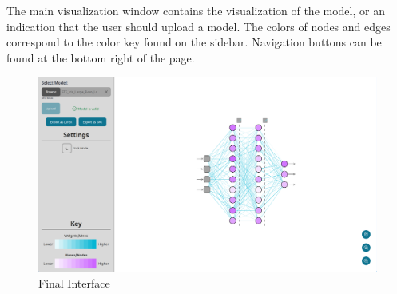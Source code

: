 The main visualization window contains the visualization of the model, or an indication that the user should upload a model. The colors of nodes and edges correspond to the color key found on the sidebar. Navigation buttons can be found at the bottom right of the page.

\begin{figure}[ht]
    \centering
    \includegraphics[width=1\textwidth]{03_design/res/final_interface.png}
    \caption{Final Interface}
    \label{fig:ui_final}
\end{figure}

